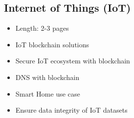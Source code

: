 \subsection{Internet of Things (IoT)}


\begin{itemize}
  \item Length: 2-3 pages
  \item IoT blockchain solutions \cite{Khan2018}
  \item Secure IoT ecosystem with blockchain \cite{Banerjee2018}
  \item DNS with blockchain \cite{Duan2018}
  \item Smart Home use case \cite{Dorri2017a}
  \item Ensure data integrity of IoT datasets \cite{Kshetri}
\end{itemize}
